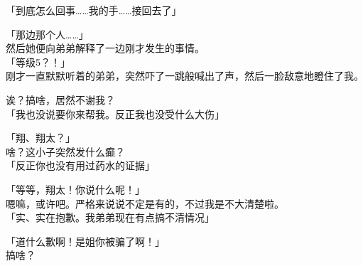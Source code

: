 「到底怎么回事……我的手……接回去了」

「那边那个人……」\\

然后她便向弟弟解释了一边刚才发生的事情。\\

「等级5？！」\\

刚才一直默默听着的弟弟，突然吓了一跳般喊出了声，然后一脸敌意地瞪住了我。

诶？搞啥，居然不谢我？\\

「我也没说要你来帮我。反正我也没受什么大伤」

「翔、翔太？」\\

啥？这小子突然发什么癫？\\

「反正你也没有用过药水的证据」

「等等，翔太！你说什么呢！」\\

嗯嘛，或许吧。严格来说说不定是有的，不过我是不大清楚啦。\\

「实、实在抱歉。我弟弟现在有点搞不清情况」

「道什么歉啊！是姐你被骗了啊！」\\

搞啥？\\

